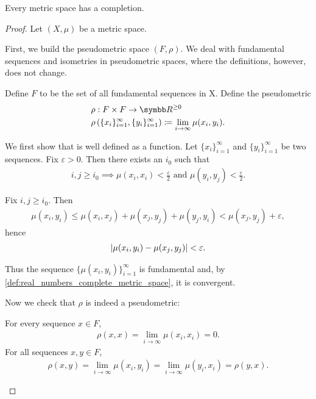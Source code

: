\begin{theorem}\label{thm:metric_space_completion_existence}
  Every metric space has a completion.
\end{theorem}
\begin{proof}
  Let \( (X, \mu) \) be a metric space.

  \begin{defenum}
    \item\label{thm:metric_space_completion_existence/part_a} First, we build the pseudometric space \( (F, \rho) \). We deal with fundamental sequences and isometries in pseudometric spaces, where the definitions, however, does not change.

     Define \( F \) to be the set of all fundamental sequences in X. Define the pseudometric
    \begin{align*}
      &\rho: F \times F \to \BB{R}^{\geq 0} \\
      &\rho\left( \{ x_i \}_{i=1}^\infty, \{ y_i \}_{i=1}^\infty \right) \coloneqq \lim_{i \to \infty} \mu(x_i, y_i).
    \end{align*}

    We first show that is well defined as a function. Let \( \{ x_i \}_{i=1}^\infty \) and \( \{ y_i \}_{i=1}^\infty \) be two sequences. Fix \( \varepsilon > 0 \). Then there exists an \( i_0 \) such that
    \begin{align*}
      i, j \geq i_0 \implies \mu(x_i, x_i) < \tfrac \varepsilon 2 \text{ and } \mu(y_i, y_j) < \tfrac \varepsilon 2.
    \end{align*}

    Fix \( i, j \geq i_0 \). Then
    \begin{align*}
      \mu(x_i, y_i) \leq \mu(x_i, x_j) + \mu(x_j, y_j) + \mu(y_j, y_i) < \mu(x_j, y_j) + \varepsilon,
    \end{align*}
    hence
    \begin{align*}
      \left\vert \mu(x_i, y_i) - \mu(x_j, y_j) \right\vert < \varepsilon.
    \end{align*}

    Thus the sequence \( \{ \mu(x_i, y_i) \}_{i=1}^\infty \) is fundamental and, by \cref{def:real_numbers_complete_metric_space}, it is convergent.

    Now we check that \( \rho \) is indeed a pseudometric:
    \begin{description}
       For every sequence \( x \in F \),
      \begin{align*}
        \rho(x, x) = \lim_{i \to \infty} \mu(x_i, x_i) = 0.
      \end{align*}
       For all sequences \( x, y \in F \),
      \begin{align*}
        \rho(x, y) = \lim_{i \to \infty} \mu(x_i, y_i) = \lim_{i \to \infty} \mu(y_i, x_i) = \rho(y, x).
      \end{align*}


\end{description}
\end{defenum}
\end{proof}
